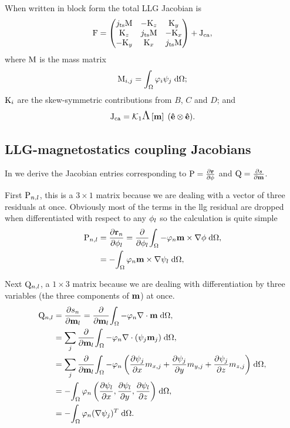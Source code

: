 When written in block form the total LLG Jacobian is
\begin{equation}
  \mathrm{F} =
  \begin{pmatrix}
    j_\mathrm{ts} \mathrm{M}    & -\mathrm{K}_z       & \mathrm{K}_y \\
    \mathrm{K}_z         & j_\mathrm{ts}\mathrm{M}    & -\mathrm{K}_x \\
    -\mathrm{K}_y        & \mathrm{K}_x        & j_\mathrm{ts} \mathrm{M}
  \end{pmatrix} + \mathrm{J}_\mathrm{ca},
\end{equation}
where $\mathrm{M}$ is the mass matrix
\begin{equation}
  \label{eq:mass-matrix}
  \Mm_{i,j} = \intd{\tbf_i \sbf_j};
\end{equation}
$\mathrm{K}_i$ are the skew-symmetric contributions from $B$, $C$ and $D$; and
\begin{equation}
  \mathrm{J}_\mathrm{ca} = \mathcal{K}_1 \text{\Large{$\Lambda$}}\left[ \mathbf{m} \right] \; (\mathbf{\hat{e}}  \otimes \mathbf{\hat{e}}).
\end{equation}

\subsection{LLG-magnetostatics coupling Jacobians}
\label{sec:llg-magn-coupl}

In  we derive the Jacobian entries corresponding to $\mathrm{P} = \frac{\partial \mathbf{r}}{\partial \phi}$ and $\mathrm{Q} = \frac{\partial s}{\partial \mathbf{m}}$.

First $\mathrm{P}_{n,l}$, this is a $3 \times 1$ matrix because we are dealing with a vector of three residuals at once.
Obviously most of the terms in the llg residual are dropped when differentiated with respect to any $\phi_{l}$ so the calculation is quite simple
\begin{equation}
  \begin{aligned}
    \mathrm{P}_{n,l} &= \frac{\partial \mathbf{r}_n}{\partial \phi_l} 
    = \frac{\partial }{\partial \phi_l} {\int_{\Omega} { -\varphi_n \mathbf{m} \times \nabla \phi} {\; \mathrm{{d}}} {\Omega}}, \\
    &= -{\int_{\Omega} { \varphi_n \mathbf{m} \times \nabla \psi_l} {\; \mathrm{{d}}} {\Omega}}, \\
  \end{aligned}
\end{equation}

Next $\mathrm{Q}_{n,l}$, a $1 \times 3$ matrix because we are dealing with differentiation by three variables (the three components of $\mathbf{m}$) at once.
\begin{equation}
  \begin{aligned}
    \mathrm{Q}_{n,l} &= \frac{\partial s_n}{\partial \mathbf{m}_l} = \frac{\partial }{\partial \mathbf{m}_l} {\int_{\Omega} { -\varphi_n \nabla \cdot \mathbf{m}} {\; \mathrm{{d}}} {\Omega}}, \\
    &= \sum_j \frac{\partial }{\partial \mathbf{m}_l} {\int_{\Omega} { -\varphi_n \nabla \cdot (\psi_j \mathbf{m}_j)} {\; \mathrm{{d}}} {\Omega}}, \\
    &= \sum_j \frac{\partial }{\partial \mathbf{m}_l} {\int_{\Omega} { -\varphi_n \left( \frac{\partial \psi_j}{\partial x} m_{x,j} 
        + \frac{\partial \psi_j}{\partial y} m_{y,j} + \frac{\partial \psi_j}{\partial z} m_{z,j} \right) } {\; \mathrm{{d}}} {\Omega}}, \\
    &= -{\int_{\Omega} { \varphi_n \left( \frac{\partial \psi_l}{\partial x}, 
        \frac{\partial \psi_l}{\partial y}, \frac{\partial \psi_l}{\partial z} \right) } {\; \mathrm{{d}}} {\Omega}}, \\
    &= -{\int_{\Omega} {\varphi_n (\nabla \psi_j)^T} {\; \mathrm{{d}}} {\Omega}}.
  \end{aligned}
\end{equation}

